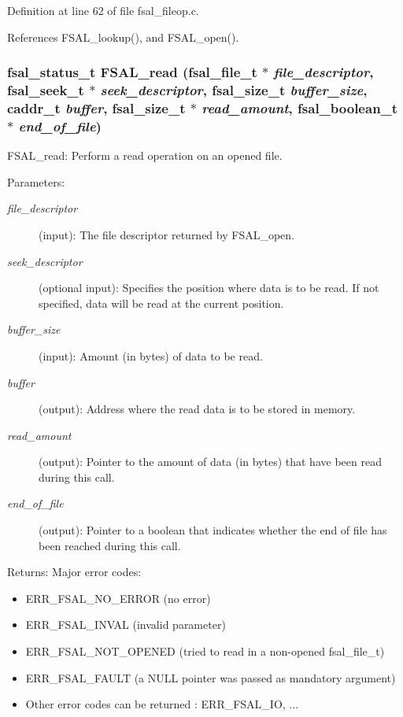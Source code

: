 Definition at line 62 of file fsal\_\-fileop.c.

References FSAL\_\-lookup(), and FSAL\_\-open().
\subsubsection{\setlength{\rightskip}{0pt plus 5cm}fsal\_\-status\_\-t FSAL\_\-read (fsal\_\-file\_\-t $\ast$ {\em file\_\-descriptor}, fsal\_\-seek\_\-t $\ast$ {\em seek\_\-descriptor}, fsal\_\-size\_\-t {\em buffer\_\-size}, caddr\_\-t {\em buffer}, fsal\_\-size\_\-t $\ast$ {\em read\_\-amount}, fsal\_\-boolean\_\-t $\ast$ {\em end\_\-of\_\-file})}\label{fsal__fileop_8c_a2}


FSAL\_\-read: Perform a read operation on an opened file.

\begin{Desc}
\item[Parameters:]
\begin{description}
\item[{\em file\_\-descriptor}](input): The file descriptor returned by FSAL\_\-open. \item[{\em seek\_\-descriptor}](optional input): Specifies the position where data is to be read. If not specified, data will be read at the current position. \item[{\em buffer\_\-size}](input): Amount (in bytes) of data to be read. \item[{\em buffer}](output): Address where the read data is to be stored in memory. \item[{\em read\_\-amount}](output): Pointer to the amount of data (in bytes) that have been read during this call. \item[{\em end\_\-of\_\-file}](output): Pointer to a boolean that indicates whether the end of file has been reached during this call.\end{description}
\end{Desc}
\begin{Desc}
\item[Returns:]Major error codes:\begin{itemize}
\item ERR\_\-FSAL\_\-NO\_\-ERROR (no error)\item ERR\_\-FSAL\_\-INVAL (invalid parameter)\item ERR\_\-FSAL\_\-NOT\_\-OPENED (tried to read in a non-opened fsal\_\-file\_\-t)\item ERR\_\-FSAL\_\-FAULT (a NULL pointer was passed as mandatory argument)\item Other error codes can be returned : ERR\_\-FSAL\_\-IO, ...\end{itemize}
\end{Desc}


